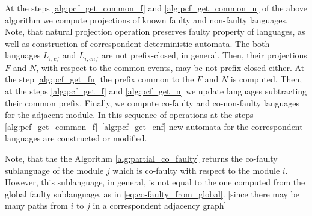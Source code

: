 \documentclass[a4paper, 10pt, conference]{ieeeconf}
\begin{document}
At the steps \ref{alg:pcf_get_common_f} and \ref{alg:pcf_get_common_n} of the
above algorithm we compute projections of known faulty and non-faulty languages.
Note, that natural projection operation preserves faulty property of languages,
as well as construction of correspondent deterministic automata. The both
languages $L_{i,cf}$ and $L_{i,cnf}$ are not prefix-closed, in general. Then,
their projections $F$ and $N$, with respect to the common events, may be not
prefix-closed either. At the step \ref{alg:pcf_get_fn} the prefix common to the
$F$ and $N$ is computed. Then, at the steps \ref{alg:pcf_get_f} and
\ref{alg:pcf_get_n} we update languages subtracting their common prefix.
Finally, we compute co-faulty and co-non-faulty languages for the adjacent
module. In this sequence of operations at the steps
\ref{alg:pcf_get_common_f}--\ref{alg:pcf_get_cnf} new automata for
the correspondent languages are constructed or modified.

Note, that the the Algorithm \ref{alg:partial_co_faulty} returns the co-faulty
sublanguage of the module $j$ which is co-faulty with respect to the module $i$.
However, this sublanguage, in general, is not equal to the one computed from the
global faulty sublanguage, as in \ref{eq:co-faulty_from_global}. [since there
may be many paths from $i$ to $j$ in a correspondent adjacency graph]
\end{document}
